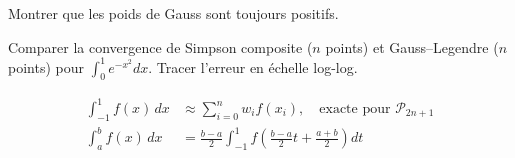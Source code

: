 \begin{exercice}[$\star\star$]
Montrer que les poids de Gauss sont toujours positifs.
\end{exercice}

\begin{exercice}
Comparer la convergence de Simpson composite ($n$ points) et Gauss--Legendre ($n$ points) pour $\int_0^1 e^{-x^2}dx$. Tracer l'erreur en \'echelle log-log.
\end{exercice}

\begin{formules}
\begin{align*}
\int_{-1}^1 f(x)\,dx &\approx \sum_{i=0}^n w_i f(x_i), \quad \text{exacte pour }\mathcal{P}_{2n+1} \\
\int_a^b f(x)\,dx &= \frac{b-a}{2}\int_{-1}^1 f\!\left(\frac{b-a}{2}t+\frac{a+b}{2}\right)dt
\end{align*}
\end{formules}
